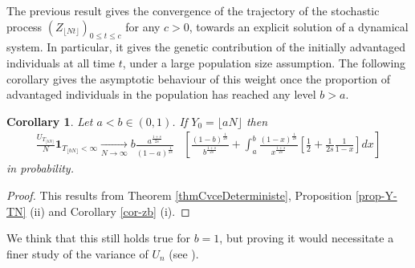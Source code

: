 \documentclass[11pt]{article}
\newtheorem{corollary}[theorem]{Corollary}
\newtheorem{proposition}[theorem]{Proposition}
\theoremstyle{remark}
\numberwithin{equation}{section}
\begin{document}


The previous result gives the convergence of the trajectory of the stochastic process $(Z_{\lfloor Nt\rfloor})_{0\leq t\leq c}$ for any $c>0$, towards an explicit solution of a dynamical system. In particular, it gives the genetic contribution of the initially advantaged individuals at all time $t$, under a large population size assumption. The following corollary gives the asymptotic behaviour of this weight once the proportion of advantaged individuals in the population has reached any level $b>a$.



\begin{corollary}\label{cor_main} Let $a<b\in(0,1)$. If $Y_0=\lfloor aN\rfloor$ then 
\begin{align*}\frac{U_{T_{\lfloor bN\rfloor}}}{N}\mathbf{1}_{T_{\lfloor bN\rfloor}<\infty}\underset{N\rightarrow\infty}{\longrightarrow} b\frac{a^{\frac{1+s}{2s}}}{(1-a)^{\frac{1}{2s}}}&\left[\frac{(1-b)^{\frac{1}{2s}}}{b^{\frac{1+s}{2s}}}+\int_a^{b}\frac{(1-x)^{\frac{1}{2s}}}{x^{\frac{1+s}{2s}}}\left[\frac{1}{2}+\frac{1}{2s}\frac{1}{1-x}\right]dx\right] \end{align*} in probability.
\end{corollary}

\begin{proof}
This results from Theorem \ref{thmCvceDeterministe}, Proposition \ref{prop-Y-TN} (ii) and Corollary \ref{cor-zb} (i).
\end{proof}

We think that this still holds true for $b=1$, but proving it would necessitate a finer study of the variance of $U_n$  (see \cite{coronLeJan2024}). 



\end{document}
